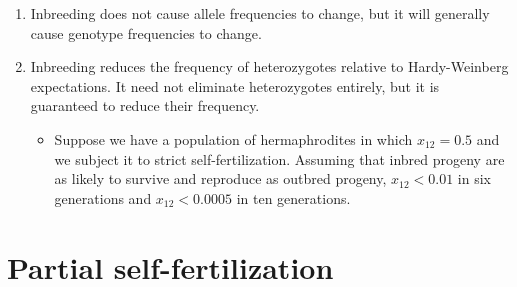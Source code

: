 \begin{enumerate}

\item Inbreeding does not cause allele frequencies to change, but it
will generally cause genotype frequencies to change.

\item Inbreeding reduces the frequency of heterozygotes relative to
Hardy-Weinberg expectations. It need not eliminate heterozygotes
entirely, but it is guaranteed to reduce their frequency.

\begin{itemize}

\item Suppose we have a population of hermaphrodites in which $x_{12}
= 0.5$ and we subject it to strict self-fertilization. Assuming that
inbred progeny are as likely to survive and reproduce as outbred
progeny, $x_{12} < 0.01$ in six generations and $x_{12} < 0.0005$ in
ten generations.

\end{itemize}

\end{enumerate}

\section*{Partial self-fertilization}


